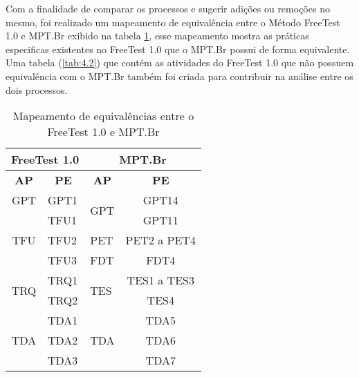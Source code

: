 Com a finalidade de comparar os processos e sugerir adições ou remoções no mesmo, foi realizado um mapeamento de equivalência entre o Método FreeTest 1.0 e MPT.Br exibido na tabela \ref{tab:4.1}, esse mapeamento mostra as práticas especificas existentes no FreeTest 1.0 que o MPT.Br possui de forma equivalente. Uma tabela (\ref{tab:4.2}) que contém as atividades do FreeTest 1.0 que não possuem equivalência com o MPT.Br também foi criada para contribuir na análise entre os dois processos.

\begin{table}[H]
\centering
\caption{Mapeamento de equivalências entre o FreeTest 1.0 e MPT.Br}
\label{tab:4.1}
\begin{tabular}{|c|l|l|c|}
\hline
\multicolumn{2}{|c|}{\textbf{FreeTest 1.0}}             & \multicolumn{2}{c|}{\textbf{MPT.Br}}           \\ \hline
\textbf{AP}          & \multicolumn{1}{c|}{\textbf{PE}} & \multicolumn{1}{c|}{\textbf{AP}} & \textbf{PE} \\ \hline
GPT                  & GPT1                             & \multirow{2}{*}{GPT}             & GPT14       \\ \cline{1-2} \cline{4-4} 
\multirow{3}{*}{TFU} & TFU1                             &                                  & GPT11       \\ \cline{2-4} 
                     & TFU2                             & PET                              & PET2 a PET4 \\ \cline{2-4} 
                     & TFU3                             & FDT                              & FDT4        \\ \hline
\multirow{2}{*}{TRQ} & TRQ1                             & \multirow{2}{*}{TES}             & TES1 a TES3 \\ \cline{2-2} \cline{4-4} 
                     & TRQ2                             &                                  & TES4        \\ \hline
\multirow{3}{*}{TDA} & TDA1                             & \multirow{3}{*}{TDA}             & TDA5        \\ \cline{2-2} \cline{4-4} 
                     & TDA2                             &                                  & TDA6        \\ \cline{2-2} \cline{4-4} 
                     & TDA3                             &                                  & TDA7        \\ \hline
\end{tabular}
\end{table}



